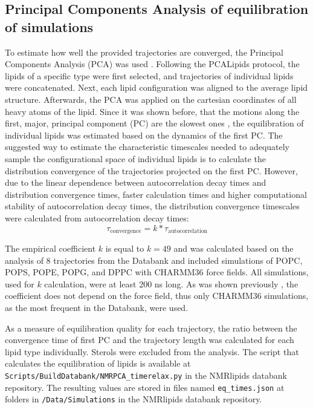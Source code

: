 \documentclass[fleqn,10pt]{wlscirep}
\begin{document}
\subsection{Principal Components Analysis of equilibration of simulations}
To estimate how well the provided trajectories are converged, the Principal Components Analysis (PCA) was used \cite{buslaev16,buslaev2020principal}. Following the PCALipids \cite{buslaev2020principal} protocol, the lipids of a specific type were first selected, and trajectories of individual lipids were concatenated. Next, each lipid configuration was aligned to the average lipid structure. Afterwards, the PCA was applied on the cartesian coordinates of all heavy atoms of the lipid. Since it was shown before, that the motions along the first, major, principal component (PC) are the slowest ones \cite{buslaev16}, the equilibration of individual lipids was estimated based on the dynamics of the first PC. The suggested way to estimate the characteristic timescales needed to adequately sample the configurational space of individual lipids is to calculate the distribution convergence of the trajectories projected on the first PC\cite{buslaev16}. However, due to the linear dependence between autocorrelation decay times and distribution convergence times, faster calculation times and higher computational stability of autocorrelation decay times\cite{buslaev16, buslaev2020principal}, the distribution convergence timescales were calculated from autocorrelation decay times:
\begin{equation}
    \tau_{\text{convergence}} = k*\tau_{\text{autocorrelation}}
\end{equation}

The empirical coefficient $k$ is equal to $k = 49$ and was calculated based on the analysis of 8 trajectories from the Databank and included simulations of POPC, POPS, POPE, POPG, and DPPC with CHARMM36 force fields. All simulations, used for $k$ calculation, were at least 200 ns long. As was shown previously \cite{buslaev16}, the coefficient does not depend on the force field, thus only CHARMM36 simulations, as the most frequent in the Databank, were used. 

As a measure of equilibration quality for each trajectory, the ratio between the convergence time of first PC and the trajectory length was calculated for each lipid type individually. Sterols were excluded from the analysis. The script that calculates the equilibration of lipids is available at \texttt{Scripts/BuildDatabank/NMRPCA\_timerelax.py} in the NMRlipids databank repository. The resulting values are stored in files named \texttt{eq\_times.json} at folders in \texttt{/Data/Simulations} in the NMRlipids databank repository. 
\end{document}
